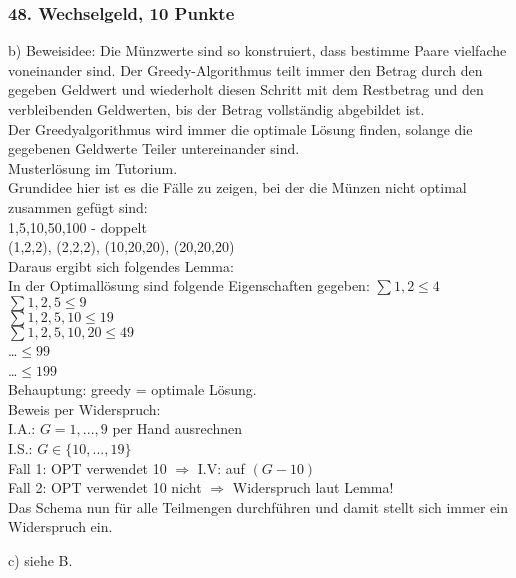 \documentclass[ngerman,a4paper]{report}
\begin{document}
\subsubsection*{48. Wechselgeld, 10 Punkte}
\begin{compactitem}
\item[b)] Beweisidee: Die Münzwerte sind so konstruiert, dass bestimme Paare vielfache voneinander sind. Der Greedy-Algorithmus teilt immer den Betrag durch den gegeben Geldwert und wiederholt diesen Schritt mit dem Restbetrag und den verbleibenden Geldwerten, bis der Betrag vollständig abgebildet ist.\\ Der Greedyalgorithmus wird immer die optimale Lösung finden, solange die gegebenen Geldwerte Teiler untereinander sind.\\

Musterlösung im Tutorium.\\
Grundidee hier ist es die Fälle zu zeigen, bei der die Münzen nicht optimal zusammen gefügt sind:\\
1,5,10,50,100 - doppelt\\
(1,2,2), (2,2,2), (10,20,20), (20,20,20)\\

Daraus ergibt sich folgendes Lemma:\\
In der Optimallösung sind folgende Eigenschaften gegeben:
$\sum 1,2 \leq 4$\\
$\sum 1,2,5 \leq 9$\\
$\sum 1,2,5,10 \leq 19$\\
$\sum 1,2,5,10,20 \leq 49$\\
\dots $\leq 99$\\
\dots $\leq 199$\\

Behauptung: greedy = optimale Lösung.\\
Beweis per Widerspruch:\\
I.A.: $G=1,...,9$ per Hand ausrechnen\\
I.S.: $G \in \{ 10,...,19 \}$\\
Fall 1: OPT verwendet 10 $\Rightarrow$ I.V: auf $(G-10)$\\
Fall 2: OPT verwendet 10 nicht $\Rightarrow$ Widerspruch laut Lemma!\\
Das Schema nun für alle Teilmengen durchführen und damit stellt sich immer ein Widerspruch ein.\\

\item[c)] siehe B. 
\end{compactitem}
\end{document}
